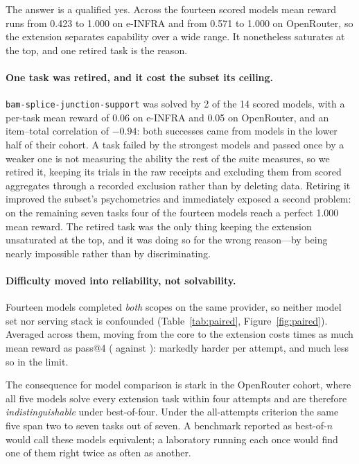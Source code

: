 \documentclass[11pt]{article}
\begin{document}
The answer is a qualified yes.
Across the fourteen scored models mean reward runs from 0.423 to 1.000 on e-INFRA and from 0.571 to 1.000 on OpenRouter, so the extension separates capability over a wide range.
It nonetheless saturates at the top, and one retired task is the reason.

\paragraph{One task was retired, and it cost the subset its ceiling.}
\texttt{bam-splice-junction-support} was solved by 2 of the 14 scored models, with a per-task mean reward of 0.06 on e-INFRA and 0.05 on OpenRouter, and an item--total correlation of $-0.94$: both successes came from models in the lower half of their cohort.
A task failed by the strongest models and passed once by a weaker one is not measuring the ability the rest of the suite measures, so we retired it, keeping its trials in the raw receipts and excluding them from scored aggregates through a recorded exclusion rather than by deleting data.
Retiring it improved the subset's psychometrics and immediately exposed a second problem: on the remaining seven tasks four of the fourteen models reach a perfect 1.000 mean reward.
The retired task was the only thing keeping the extension unsaturated at the top, and it was doing so for the wrong reason---by being nearly impossible rather than by discriminating.

\paragraph{Difficulty moved into reliability, not solvability.}
Fourteen models completed \emph{both} scopes on the same provider, so neither model set nor serving stack is confounded (Table~\ref{tab:paired}, Figure~\ref{fig:paired}).
Averaged across them, moving from the core to the extension costs \pairedDropRatio{} times as much mean reward as pass@4 (\pairedDropMeanReward{} against \pairedDropPassAtK{}): markedly harder per attempt, and much less so in the limit.

The consequence for model comparison is stark in the OpenRouter cohort, where all five models solve every extension task within four attempts and are therefore \emph{indistinguishable} under best-of-four.
Under the all-attempts criterion the same five span two to seven tasks out of seven.
A benchmark reported as best-of-$n$ would call these models equivalent; a laboratory running each once would find one of them right twice as often as another.
\end{document}
